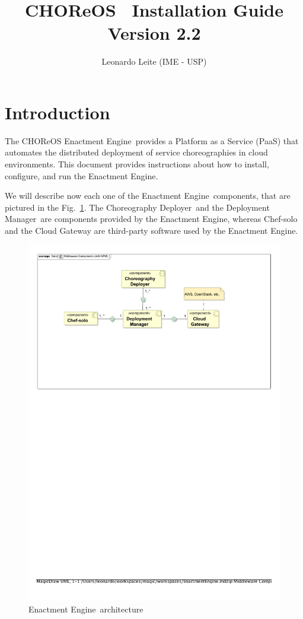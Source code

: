 \documentclass[a4paper, 10pt]{article}
\title{CHOReOS \ee\ Installation Guide \\ {\normalsize Version 2.2}}
\author{Leonardo Leite (IME - USP)}
\newcommand{\ee}{Enactment Engine}
\newcommand{\cd}{Choreography Deployer}
\newcommand{\dm}{Deployment Manager}
\begin{document}
\maketitle

\section{Introduction}

The CHOReOS \ee\ provides a Platform as a Service (PaaS) that automates the distributed deployment of service choreographies in cloud environments. This document provides instructions about how to install, configure, and run the \ee.

We will describe now each one of the \ee\ components, that are pictured in the Fig.~\ref{fig:ee_components}. The \cd\ and the \dm\ are components provided by the \ee, whereas Chef-solo and the Cloud Gateway are third-party software used by the \ee.

\begin{figure}
\centering
\includegraphics[scale=0.8]{img/components.pdf}
\caption{\ee\ architecture}
\label{fig:ee_components}
\end{figure}
\end{document}
